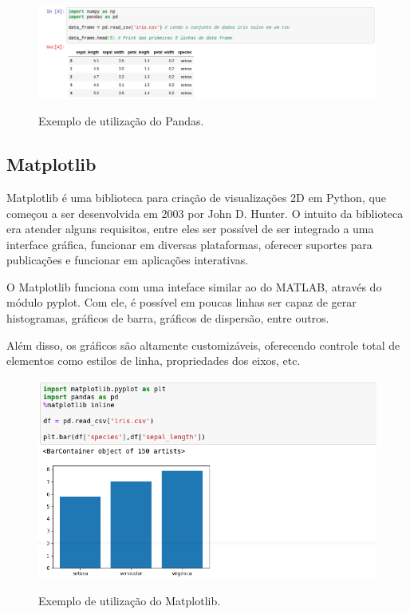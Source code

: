 \begin{figure}[h]
\caption{\small Exemplo de utilização do Pandas.}
\centering
\includegraphics[scale=0.40]{figs/exemplo-pandas.png}
\label{f.exemplo-pandas}
\end{figure}

\subsection{Matplotlib}
\label{ss.matplotlib}

Matplotlib é uma biblioteca para criação de visualizações 2D em Python, que começou a ser desenvolvida em 2003 por John D. Hunter. O intuito da biblioteca era atender alguns requisitos, entre eles ser possível de ser integrado a uma interface gráfica, funcionar em diversas plataformas, oferecer suportes para publicações e funcionar em aplicações interativas. \cite{matplotlib}

O Matplotlib funciona com uma inteface similar ao do MATLAB, através do módulo pyplot. Com ele, é possível em poucas linhas ser capaz de gerar histogramas, gráficos de barra, gráficos de dispersão, entre outros.

Além disso, os gráficos são altamente customizáveis, oferecendo controle total de elementos como estilos de linha, propriedades dos eixos, etc.

\begin{figure}[h]
\caption{\small Exemplo de utilização do Matplotlib.}
\centering
\includegraphics[scale=2]{figs/exemplo-pyplot.png}
\label{f.exemplo-matplotlib}
\end{figure}

